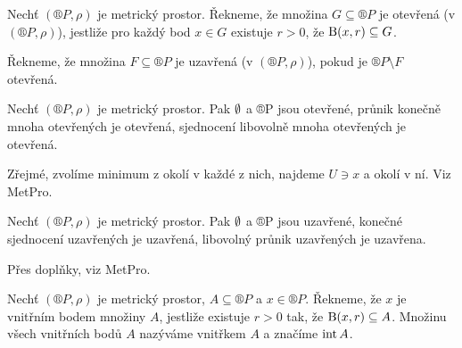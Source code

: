 \documentclass[12pt]{article}                   %
\begin{document}
        \begin{definice}
            Nechť $(®P, \rho)$ je metrický prostor. Řekneme, že množina $G \subseteq ®P$ je otevřená (v $(®P, \rho)$), jestliže pro každý bod $x \in G$ existuje $r > 0$, že $\operatorname{B}(x, r) \subseteq G$.

            Řekneme, že množina $F \subseteq ®P$ je uzavřená (v $(®P, \rho)$), pokud je $®P\setminus F$ otevřená.
        \end{definice}

        \begin{veta}
            Nechť $(®P, \rho)$ je metrický prostor. Pak $\emptyset$ a ®P jsou otevřené, průnik konečně mnoha otevřených je otevřená, sjednocení libovolně mnoha otevřených je otevřená.

            \begin{dukazin}
                Zřejmé, zvolíme minimum z okolí v každé z nich, najdeme $U \ni x$ a okolí v ní. Viz MetPro.
            \end{dukazin}
        \end{veta}

        \begin{veta}
            Nechť $(®P, \rho)$ je metrický prostor. Pak $\emptyset$ a ®P jsou uzavřené, konečné sjednocení uzavřených je uzavřená, libovolný průnik uzavřených je uzavřena.


            \begin{dukazin}
                Přes doplňky, viz MetPro.
            \end{dukazin}
        \end{veta}

        \begin{definice}
            Nechť $(®P, \rho)$ je metrický prostor, $A \subseteq ®P$ a $x \in ®P$. Řekneme, že $x$ je vnitřním bodem množiny $A$, jestliže existuje $r > 0$ tak, že $\operatorname{B}(x, r) \subseteq A$. Množinu všech vnitřních bodů $A$ nazýváme vnitřkem $A$ a značíme $\operatorname{int} A$.
        \end{definice}
\end{document}
